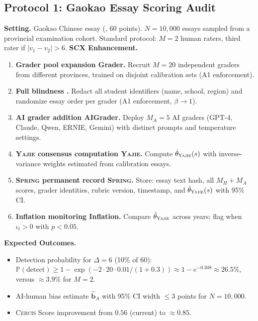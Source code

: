 \documentclass[11pt,a4paper]{article}
\theoremstyle{definition}
\theoremstyle{remark}
\newcommand{\Yajie}{\textsc{Yajie}}
\newcommand{\Cercis}{\textsc{Cercis}}
\newcommand{\Spring}{\textsc{Spring}}
\newcommand{\Pbb}{\mathbb{P}}
\newcommand{\inflationRate}{\iota}
\newcommand{\biasVec}{\mathbf{b}}
\begin{document}
\subsection{Protocol 1: Gaokao Essay Scoring Audit}
\textbf{Setting.} Gaokao Chinese essay (, 60 points). $N = 10,000$ essays sampled from a provincial examination cohort. Standard protocol: $M=2$ human raters, third rater if $|v_1 - v_2| > 6$.
\textbf{SCX Enhancement.}
\begin{enumerate}[label=Step \arabic*:, nosep]
    \item \textbf{Grader pool expansion Grader.} Recruit $M = 20$ independent graders from different provinces, trained on disjoint calibration sets (A1 enforcement).
    \item \textbf{Full blindness .} Redact all student identifiers (name, school, region) and randomize essay order per grader (A1 enforcement, $\beta \to 1$).
    \item \textbf{AI grader addition AIGrader.} Deploy $M_A = 5$ AI graders (GPT-4, Claude, Qwen, ERNIE, Gemini) with distinct prompts and temperature settings.
    \item \textbf{\Yajie{} consensus computation \Yajie{}.} Compute $\hat{\theta}_{\Yajie}(s)$ with inverse-variance weights estimated from calibration essays.
    \item \textbf{\Spring{} permanent record \Spring{}.} Store: essay text hash, all $M_H + M_A$ scores, grader identities, rubric version, timestamp, and $\hat{\theta}_{\Yajie}(s)$ with 95\% CI.
    \item \textbf{Inflation monitoring Inflation.} Compare $\hat{\theta}_{\Yajie}$ across years; flag when $\inflationRate_t > 0$ with $p < 0.05$.
\end{enumerate}
\textbf{Expected Outcomes.}
\begin{itemize}[nosep]
    \item Detection probability for $\Delta = 6$ (10\% of 60): $\Pbb(\text{detect}) \ge 1 - \exp(-2 \cdot 20 \cdot 0.01 / (1+0.3)) \approx 1 - e^{-0.308} \approx 26.5\%$, versus $\approx 3.9\%$ for $M=2$.
    \item AI-human bias estimate $\hat{\biasVec}_A$ with 95\% CI width $\le 3$ points for $N=10,000$.
    \item \Cercis{} Score improvement from $0.56$ (current) to $\approx 0.85$.
\end{itemize}
\end{document}
